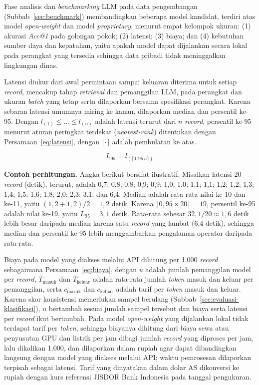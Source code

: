 Fase analisis dan \textit{benchmarking} LLM pada data pengembangan (Subbab~\ref{sec:benchmark}) membandingkan beberapa model kandidat, terdiri atas model \textit{open-weight} dan model \textit{proprietary}, menurut empat kelompok ukuran: (1) akurasi \textit{Acc@1} pada golongan pokok; (2) latensi; (3) biaya; dan (4) kebutuhan sumber daya dan kepatuhan, yaitu apakah model dapat dijalankan secara lokal pada perangkat yang tersedia sehingga data pribadi tidak meninggalkan lingkungan dinas.

Latensi diukur dari awal permintaan sampai keluaran diterima untuk setiap \textit{record}, mencakup tahap \textit{retrieval} dan pemanggilan LLM, pada perangkat dan ukuran \textit{batch} yang tetap serta dilaporkan bersama spesifikasi perangkat. Karena sebaran latensi umumnya miring ke kanan, dilaporkan median dan persentil ke-95. Dengan $l_{(1)} \leq \dots \leq l_{(n)}$ adalah latensi terurut dari $n$ \textit{record}, persentil ke-95 menurut aturan peringkat terdekat (\textit{nearest-rank}) ditentukan dengan Persamaan~\eqref{eq:latensi}, dengan $\lceil \cdot \rceil$ adalah pembulatan ke atas.

\begin{equation}
  L_{95} = l_{(\lceil 0{,}95\, n \rceil)}
  \label{eq:latensi}
\end{equation}

\noindent\textbf{Contoh perhitungan.} Angka berikut bersifat ilustratif. Misalkan latensi 20 \textit{record} (detik), terurut, adalah 0,7; 0,8; 0,8; 0,9; 0,9; 1,0; 1,0; 1,1; 1,1; 1,2; 1,2; 1,3; 1,4; 1,5; 1,6; 1,8; 2,0; 2,3; 3,1; dan 6,4. Median adalah rata-rata nilai ke-10 dan ke-11, yaitu $(1{,}2 + 1{,}2)/2 = 1{,}2$ detik. Karena $\lceil 0{,}95 \times 20 \rceil = 19$, persentil ke-95 adalah nilai ke-19, yaitu $L_{95} = 3{,}1$ detik. Rata-rata sebesar $32{,}1/20 \approx 1{,}6$ detik lebih besar daripada median karena satu \textit{record} yang lambat (6,4 detik), sehingga median dan persentil ke-95 lebih menggambarkan pengalaman operator daripada rata-rata.

Biaya pada model yang diakses melalui API dihitung per 1.000 \textit{record} sebagaimana Persamaan~\eqref{eq:biaya}, dengan $u$ adalah jumlah pemanggilan model per \textit{record}, $\bar{T}_{\text{masuk}}$ dan $\bar{T}_{\text{keluar}}$ adalah rata-rata jumlah \textit{token} masuk dan keluar per pemanggilan, serta $c_{\text{masuk}}$ dan $c_{\text{keluar}}$ adalah tarif per \textit{token} masuk dan keluar. Karena skor konsistensi memerlukan sampel berulang (Subbab~\ref{sec:evaluasi-klasifikasi}), $u$ bertambah sesuai jumlah sampel tersebut dan biaya serta latensi per \textit{record} ikut bertambah. Pada model \textit{open-weight} yang dijalankan lokal tidak terdapat tarif per \textit{token}, sehingga biayanya dihitung dari biaya sewa atau penyusutan GPU dan listrik per jam dibagi jumlah \textit{record} yang diproses per jam, lalu dikalikan 1.000, dan dilaporkan dalam rupiah agar dapat dibandingkan langsung dengan model yang diakses melalui API; waktu pemrosesan dilaporkan terpisah sebagai latensi. Tarif yang dinyatakan dalam dolar AS dikonversi ke rupiah dengan kurs referensi JISDOR Bank Indonesia pada tanggal pengukuran.

